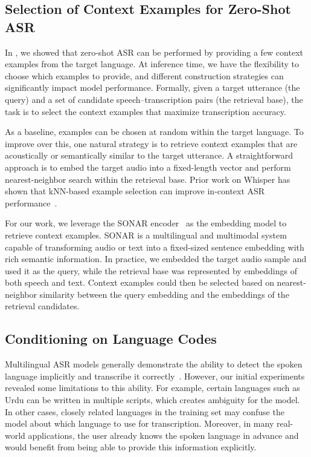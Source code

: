 \documentclass[]{fairmeta}
\begin{document}
\subsection{Selection of Context Examples for Zero-Shot ASR}
\label{sec:zs_icl}

In , we showed that zero-shot ASR can be performed by providing a few context examples from the target language. At inference time, we have the flexibility to choose which examples to provide, and different construction strategies can significantly impact model performance.
Formally, given a target utterance (the query) and a set of candidate speech–transcription pairs (the retrieval base), the task is to select the context examples that maximize transcription accuracy.

As a baseline, examples can be chosen at random within the target language. To improve over this, one natural strategy is to retrieve context examples that are acoustically or semantically similar to the target utterance. A straightforward approach is to embed the target audio into a fixed-length vector and perform nearest-neighbor search within the retrieval base. Prior work on Whisper has shown that kNN-based example selection can improve in-context ASR performance~\citep{wang2024can}.

For our work, we leverage the SONAR encoder~\citep{duquenne2023sonar} as the embedding model to retrieve context examples. SONAR is a multilingual and multimodal system capable of transforming audio or text into a fixed-sized sentence embedding with rich semantic information. In practice, we embedded the target audio sample and used it as the query, while the retrieval base was represented by embeddings of both speech and text. Context examples could then be selected based on nearest-neighbor similarity between the query embedding and the embeddings of the retrieval candidates.


\subsection{Conditioning on Language Codes} \label{sec:lid}

Multilingual ASR models generally demonstrate the ability to detect the spoken language implicitly and transcribe it correctly~\citep{pratap2024scaling,radford2023robust}. However, our initial experiments revealed some limitations to this ability. For example, certain languages such as Urdu can be written in multiple scripts, which creates ambiguity for the model. In other cases, closely related languages in the training set may confuse the model about which language to use for transcription. Moreover, in many real-world applications, the user already knows the spoken language in advance and would benefit from being able to provide this information explicitly.
\end{document}
